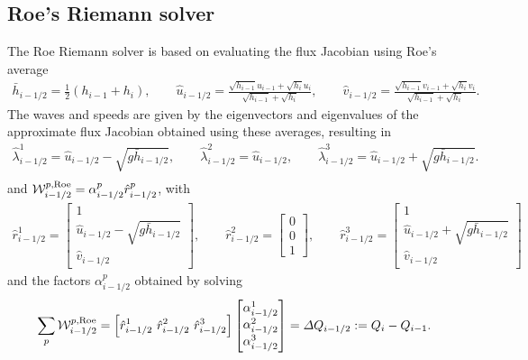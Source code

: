 \documentclass[preprint, 11pt]{article}
\newcommand{\W}{{\mathcal W}}
\newcommand{\imh}{{i-1/2}}
\newcommand{\bfr}{{r}}
\newcommand{\bfq}{{Q}}
\newcommand{\Roe}{{\rm Roe}}
\begin{document}
\subsection{Roe's Riemann solver} \label{sec:roe}
The Roe Riemann solver is based on evaluating the flux Jacobian using Roe's average
\begin{align}\label{roe_average}
  \bar h_{i-1/2}=\frac{1}{2}(h_{i-1}+h_i), \qquad
  \hat u_{i-1/2}=\frac{\sqrt{h_{i-1}}u_{i-1}+\sqrt{h_i}u_i}{\sqrt{h_{i-1}}+\sqrt{h_i}}, \qquad
  \hat v_{i-1/2}=\frac{\sqrt{h_{i-1}}v_{i-1}+\sqrt{h_i}v_i}{\sqrt{h_{i-1}}+\sqrt{h_i}}.
\end{align}
The waves and speeds are given by the eigenvectors and eigenvalues of the approximate
flux Jacobian obtained using these averages, resulting in
\begin{align*}
  \hat\lambda_{i-1/2}^1=\hat u_{i-1/2}-\sqrt{g\bar h_{i-1/2}}, \qquad
  \hat\lambda_{i-1/2}^2=\hat u_{i-1/2}, \qquad
  \hat\lambda_{i-1/2}^3=\hat u_{i-1/2}+\sqrt{g\bar h_{i-1/2}}. \\
\end{align*}
and $\W_{i-1/2}^{p,\Roe}=\alpha_{i-1/2}^p\hat r_{i-1/2}^p$, with
\begin{align*}
  \hat \bfr^1_{i-1/2} =
  \begin{bmatrix}
    1 \\
    \hat u_{i-1/2}-\sqrt{g\bar h_{i-1/2}}\\
    \hat v_{i-1/2}
  \end{bmatrix},
  \qquad
  \hat \bfr^2_{i-1/2} =
  \begin{bmatrix}
    0\\
    0\\
    1
  \end{bmatrix},
  \qquad
  \hat \bfr^3_{i-1/2} =
  \begin{bmatrix}
    1 \\
    \hat u_{i-1/2}+\sqrt{g\bar h_{i-1/2}}\\
    \hat v_{i-1/2}
  \end{bmatrix}
\end{align*}
and the factors $\alpha^p_\imh$ obtained by solving
\begin{align}\label{system_for_alphas}
  \sum_p\W_{i-1/2}^{p,\Roe} = \left[\hat \bfr^1_{i-1/2} ~\hat \bfr^2_{i-1/2} ~\hat \bfr^3_{i-1/2}\right]
  \begin{bmatrix}
    \alpha^1_{i-1/2} \\
    \alpha^2_{i-1/2} \\
    \alpha^3_{i-1/2}
  \end{bmatrix}
  =\Delta Q_{i-1/2}:=\bfq_i-\bfq_{i-1}.
\end{align}
\end{document}
